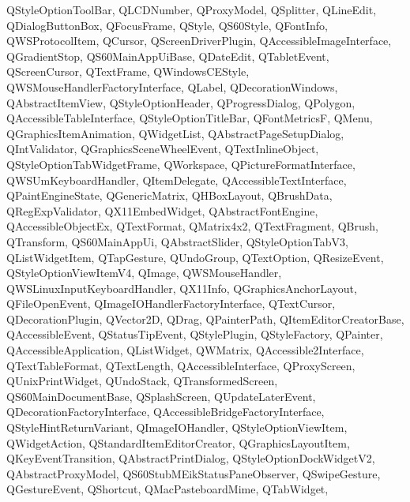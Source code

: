 {{    QStyleOptionToolBar,%
    QLCDNumber,%
    QProxyModel,%
    QSplitter,%
    QLineEdit,%
    QDialogButtonBox,%
    QFocusFrame,%
    QStyle,%
    QS60Style,%
    QFontInfo,%
    QWSProtocolItem,%
    QCursor,%
    QScreenDriverPlugin,%
    QAccessibleImageInterface,%
    QGradientStop,%
    QS60MainAppUiBase,%
    QDateEdit,%
    QTabletEvent,%
    QScreenCursor,%
    QTextFrame,%
    QWindowsCEStyle,%
    QWSMouseHandlerFactoryInterface,%
    QLabel,%
    QDecorationWindows,%
    QAbstractItemView,%
    QStyleOptionHeader,%
    QProgressDialog,%
    QPolygon,%
    QAccessibleTableInterface,%
    QStyleOptionTitleBar,%
    QFontMetricsF,%
    QMenu,%
    QGraphicsItemAnimation,%
    QWidgetList,%
    QAbstractPageSetupDialog,%
    QIntValidator,%
    QGraphicsSceneWheelEvent,%
    QTextInlineObject,%
    QStyleOptionTabWidgetFrame,%
    QWorkspace,%
    QPictureFormatInterface,%
    QWSUmKeyboardHandler,%
    QItemDelegate,%
    QAccessibleTextInterface,%
    QPaintEngineState,%
    QGenericMatrix,%
    QHBoxLayout,%
    QBrushData,%
    QRegExpValidator,%
    QX11EmbedWidget,%
    QAbstractFontEngine,%
    QAccessibleObjectEx,%
    QTextFormat,%
    QMatrix4x2,%
    QTextFragment,%
    QBrush,%
    QTransform,%
    QS60MainAppUi,%
    QAbstractSlider,%
    QStyleOptionTabV3,%
    QListWidgetItem,%
    QTapGesture,%
    QUndoGroup,%
    QTextOption,%
    QResizeEvent,%
    QStyleOptionViewItemV4,%
    QImage,%
    QWSMouseHandler,%
    QWSLinuxInputKeyboardHandler,%
    QX11Info,%
    QGraphicsAnchorLayout,%
    QFileOpenEvent,%
    QImageIOHandlerFactoryInterface,%
    QTextCursor,%
    QDecorationPlugin,%
    QVector2D,%
    QDrag,%
    QPainterPath,%
    QItemEditorCreatorBase,%
    QAccessibleEvent,%
    QStatusTipEvent,%
    QStylePlugin,%
    QStyleFactory,%
    QPainter,%
    QAccessibleApplication,%
    QListWidget,%
    QWMatrix,%
    QAccessible2Interface,%
    QTextTableFormat,%
    QTextLength,%
    QAccessibleInterface,%
    QProxyScreen,%
    QUnixPrintWidget,%
    QUndoStack,%
    QTransformedScreen,%
    QS60MainDocumentBase,%
    QSplashScreen,%
    QUpdateLaterEvent,%
    QDecorationFactoryInterface,%
    QAccessibleBridgeFactoryInterface,%
    QStyleHintReturnVariant,%
    QImageIOHandler,%
    QStyleOptionViewItem,%
    QWidgetAction,%
    QStandardItemEditorCreator,%
    QGraphicsLayoutItem,%
    QKeyEventTransition,%
    QAbstractPrintDialog,%
    QStyleOptionDockWidgetV2,%
    QAbstractProxyModel,%
    QS60StubMEikStatusPaneObserver,%
    QSwipeGesture,%
    QGestureEvent,%
    QShortcut,%
    QMacPasteboardMime,%
    QTabWidget,%
}}
